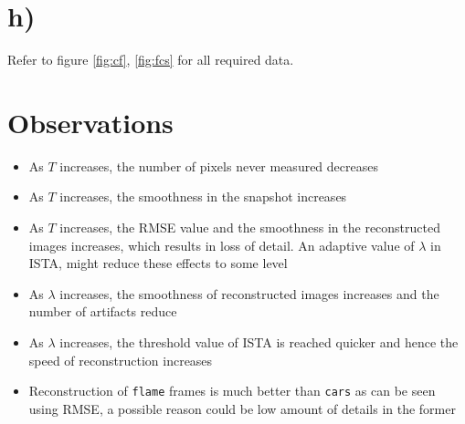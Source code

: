 \documentclass[a4paper, landscape]{article}
\begin{document}
\section*{h)}
Refer to figure \ref{fig:cf}, \ref{fig:fcs} for all required data.
\section*{Observations}
\begin{itemize}
\item As $T$ increases, the number of pixels never measured decreases
\item As $T$ increases, the smoothness in the snapshot increases
\item As $T$ increases, the RMSE value and the smoothness in the reconstructed images increases, which results in loss of detail. An adaptive value of $\lambda$ in ISTA, might reduce these effects to some level
\item As $\lambda$ increases, the smoothness of reconstructed images increases and the number of artifacts reduce
\item As $\lambda$ increases, the threshold value of ISTA is reached quicker and hence the speed of reconstruction increases
\item Reconstruction of \verb!flame! frames is much better than \verb!cars! as can be seen using RMSE, a possible reason could be low amount of details in the former
\end{itemize}
\end{document}
